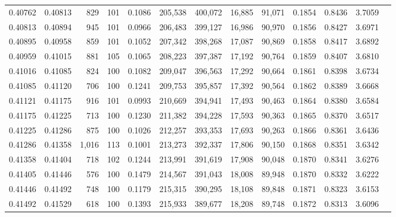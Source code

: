 \begin{tabular}{rrrrrrrrrrrrr}
0.40762 & 0.40813 &   829 & 101 &                                     0.1086 & 205,538 & 400,072 &  16,885 &  91,071 & 0.1854 & 0.8436 & 3.7059 \\
0.40813 & 0.40894 &   945 & 101 &                                     0.0966 & 206,483 & 399,127 &  16,986 &  90,970 & 0.1856 & 0.8427 & 3.6971 \\
0.40895 & 0.40958 &   859 & 101 &                                     0.1052 & 207,342 & 398,268 &  17,087 &  90,869 & 0.1858 & 0.8417 & 3.6892 \\
0.40959 & 0.41015 &   881 & 105 &                                     0.1065 & 208,223 & 397,387 &  17,192 &  90,764 & 0.1859 & 0.8407 & 3.6810 \\
0.41016 & 0.41085 &   824 & 100 &                                     0.1082 & 209,047 & 396,563 &  17,292 &  90,664 & 0.1861 & 0.8398 & 3.6734 \\
0.41085 & 0.41120 &   706 & 100 &                                     0.1241 & 209,753 & 395,857 &  17,392 &  90,564 & 0.1862 & 0.8389 & 3.6668 \\
0.41121 & 0.41175 &   916 & 101 &                                     0.0993 & 210,669 & 394,941 &  17,493 &  90,463 & 0.1864 & 0.8380 & 3.6584 \\
0.41175 & 0.41225 &   713 & 100 &                                     0.1230 & 211,382 & 394,228 &  17,593 &  90,363 & 0.1865 & 0.8370 & 3.6517 \\
0.41225 & 0.41286 &   875 & 100 &                                     0.1026 & 212,257 & 393,353 &  17,693 &  90,263 & 0.1866 & 0.8361 & 3.6436 \\
0.41286 & 0.41358 & 1,016 & 113 &                                     0.1001 & 213,273 & 392,337 &  17,806 &  90,150 & 0.1868 & 0.8351 & 3.6342 \\
0.41358 & 0.41404 &   718 & 102 &                                     0.1244 & 213,991 & 391,619 &  17,908 &  90,048 & 0.1870 & 0.8341 & 3.6276 \\
0.41405 & 0.41446 &   576 & 100 &                                     0.1479 & 214,567 & 391,043 &  18,008 &  89,948 & 0.1870 & 0.8332 & 3.6222 \\
0.41446 & 0.41492 &   748 & 100 &                                     0.1179 & 215,315 & 390,295 &  18,108 &  89,848 & 0.1871 & 0.8323 & 3.6153 \\
0.41492 & 0.41529 &   618 & 100 &                                     0.1393 & 215,933 & 389,677 &  18,208 &  89,748 & 0.1872 & 0.8313 & 3.6096 \\

\end{tabular}
